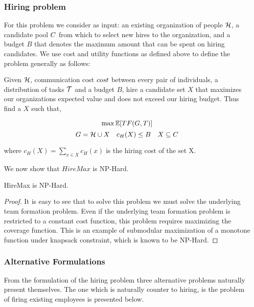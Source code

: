 \subsubsection{Hiring problem}

For this problem we consider as input: an existing organization of people $\mathcal{H}$, a candidate pool ${C}$ from which to select new hires to the organization, and a budget $B$ that denotes the maximum amount that can be spent on hiring candidates.
We use cost and utility functions as defined above to define the problem generally as follows:
\begin{problem}
[HireMax] Given $\mathcal{H}$, communication cost $cost$ between every pair of individuals, a distribution of tasks $\mathcal{T}$ and a budget $B$, hire a candidate set $X$ that maximizes our organizations expected value and does not exceed our hiring budget. Thus find a $X$ such that,

$$ \max \mathbb{E}[TF(G,T)]  $$
$$ G=\mathcal{H}  \cup X \quad c_H(X) \le B \quad X \subseteq C $$

where $c_H(X) = \sum_{x \in X} c_H(x)$ is the hiring cost of the set X.
 
\end{problem}

We now show that $HireMax$ is NP-Hard.

\begin{theorem} \label{thm:HM-hardness}
HireMax is NP-Hard.
\end{theorem}

\begin{proof}
It is easy to see that to solve this problem we must solve the underlying team formation problem. Even if the underlying team formation problem is restricted to a constant cost function, this problem requires maximizing the coverage function. This is an example of submodular maximization of a monotone function under knapsack constraint, which is known to be NP-Hard.  
\end{proof}

\subsubsection{Alternative Formulations}

From the formulation of the hiring problem three alternative problems naturally present themselves. The one which is naturally counter to hiring, is the problem of firing existing employees is presented below.  

